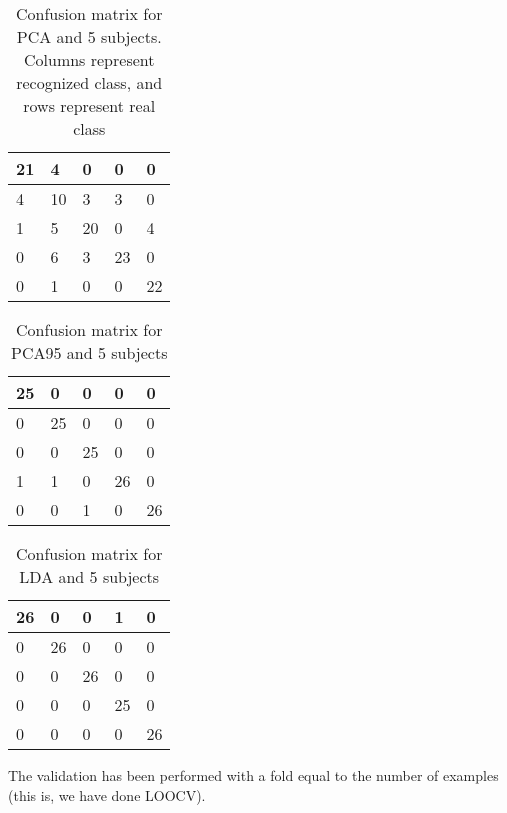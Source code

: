 \begin{itemize}
\begin{table}[]
\centering
\caption[Confusion matrix for PCA and 5 subjects]{Confusion matrix for PCA and 5 subjects. Columns represent recognized class, and rows represent real class }
\label{tab:confusionpca}
\begin{tabular}{|l|l|l|l|l|}
\hline
21 & 4  & 0  & 0  & 0  \\ \hline
4  & 10 & 3  & 3  & 0  \\ \hline
1  & 5  & 20 & 0  & 4  \\ \hline
0  & 6  & 3  & 23 & 0  \\ \hline
0  & 1  & 0  & 0  & 22 \\ \hline
\end{tabular}
\end{table}

\begin{table}[]
\centering
\caption{Confusion matrix for PCA95 and 5 subjects}
\label{tab:confusionpca95}
\begin{tabular}{|l|l|l|l|l|}
\hline
25 & 0  & 0  & 0  & 0  \\ \hline
0  & 25 & 0  & 0  & 0  \\ \hline
0  & 0  & 25 & 0  & 0  \\ \hline
1  & 1  & 0  & 26 & 0  \\ \hline
0  & 0  & 1  & 0  & 26 \\ \hline
\end{tabular}
\end{table}

\begin{table}[]
\centering
\caption{Confusion matrix for LDA and 5 subjects}
\label{tab:confusionlda}
\begin{tabular}{|l|l|l|l|l|}
\hline
26 & 0  & 0  & 1  & 0  \\ \hline
0  & 26 & 0  & 0  & 0  \\ \hline
0  & 0  & 26 & 0  & 0  \\ \hline
0  & 0  & 0  & 25 & 0  \\ \hline
0  & 0  & 0  & 0  & 26 \\ \hline
\end{tabular}
\end{table}

The validation has been performed with a fold equal to the number of examples (this is, we have done LOOCV).

\end{itemize}
